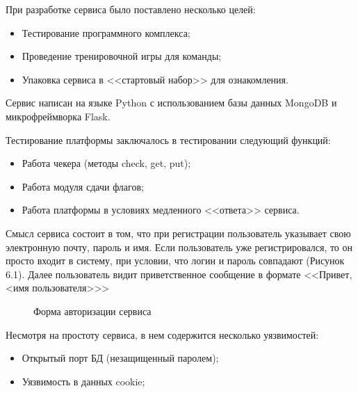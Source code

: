 При разработке сервиса было поставлено несколько целей:
\begin{itemize} 
\item Тестирование программного комплекса;
\item Проведение тренировочной игры для команды;
\item Упаковка сервиса в <<стартовый набор>> для ознакомления.
\end{itemize}

Сервис написан на языке Python с использованием базы данных MongoDB и микрофреймворка Flask.

Тестирование платформы заключалось в тестировании следующий функций:
\begin{itemize} 
\item Работа чекера (методы check, get, put);
\item Работа модуля сдачи флагов;
\item Работа платформы в условиях медленного <<ответа>> сервиса.
\end{itemize}

Смысл сервиса состоит в том, что при регистрации пользователь указывает свою электронную почту, пароль и имя.
Если пользователь уже регистрировался, то он просто входит в систему, при условии, что логин и пароль  совпадают (Рисунок 6.1). Далее пользователь видит приветственное сообщение в формате <<Привет, <имя пользователя>>>

\begin{figure}[ht!]
\caption{Форма авторизации сервиса}
\end{figure} 
\clearpage

Несмотря на простоту сервиса, в нем содержится несколько уязвимостей:
\begin{itemize} 
\item Открытый порт БД (незащищенный паролем);
\item Уязвимость в данных cookie;
\end{itemize}

